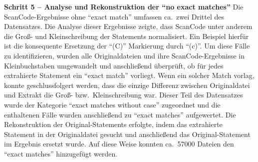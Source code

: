 \textbf{Schritt 5 -- Analyse und Rekonstruktion der \enquote{no exact matches}}
Die ScanCode-Ergebnisse ohne \enquote{exact match} umfassen ca.\ zwei Drittel des Datensatzes.
Die Analyse dieser Ergebnisse zeigte, dass ScanCode unter anderem die Groß- und Kleinschreibung der Statements normalisiert.
Ein Beispiel hierfür ist die konsequente Ersetzung der \enquote{(C)} Markierung durch \enquote{(c)}.
Um diese Fälle zu identifizieren, wurden alle Originaldateien und ihre ScanCode-Ergebnisse in Kleinbuchstaben umgewandelt und anschließend überprüft, ob für jedes extrahierte Statement ein \enquote{exact match} vorliegt.
Wenn ein solcher Match vorlag, konnte geschlussfolgert werden, dass die einzige Differenz zwischen Originaldatei und Extrakt die Groß- bzw.\ Kleinschreibung war.
Dieser Teil des Datensatzes wurde der Kategorie \enquote{exact matches without case} zugeordnet und die enthaltenen Fälle wurden anschließend zu \enquote{exact matches} aufgewertet.
Die Rekonstruktion der Original-Statements erfolgte, indem das extrahierte Statement in der Originaldatei gesucht und anschließend das Original-Statement im Ergebnis ersetzt wurde.
Auf diese Weise konnten ca.\ \num{57000} Dateien den \enquote{exact matches} hinzugefügt werden.

